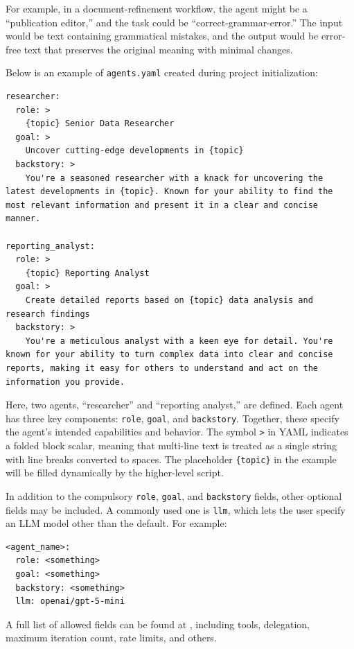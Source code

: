 For example, in a document-refinement workflow, the agent might be a ``publication editor,'' and the task could be ``correct-grammar-error.'' The input would be text containing grammatical mistakes, and the output would be error-free text that preserves the original meaning with minimal changes.

Below is an example of \verb|agents.yaml| created during project initialization:
\begin{lstlisting}
researcher:
  role: >
    {topic} Senior Data Researcher
  goal: >
    Uncover cutting-edge developments in {topic}
  backstory: >
    You're a seasoned researcher with a knack for uncovering the latest developments in {topic}. Known for your ability to find the most relevant information and present it in a clear and concise manner.

reporting_analyst:
  role: >
    {topic} Reporting Analyst
  goal: >
    Create detailed reports based on {topic} data analysis and research findings
  backstory: >
    You're a meticulous analyst with a keen eye for detail. You're known for your ability to turn complex data into clear and concise reports, making it easy for others to understand and act on the information you provide.
\end{lstlisting}

Here, two agents, ``researcher'' and ``reporting analyst,'' are defined. Each agent has three key components: \verb|role|, \verb|goal|, and \verb|backstory|. Together, these specify the agent’s intended capabilities and behavior. The symbol \verb|>| in YAML indicates a folded block scalar, meaning that multi-line text is treated as a single string with line breaks converted to spaces. The placeholder \verb|{topic}| in the example will be filled dynamically by the higher-level script.

In addition to the compulsory \verb|role|, \verb|goal|, and \verb|backstory| fields, other optional fields may be included. A commonly used one is \verb|llm|, which lets the user specify an LLM model other than the default. For example:
\begin{lstlisting}
<agent_name>:
  role: <something>
  goal: <something>
  backstory: <something>
  llm: openai/gpt-5-mini
\end{lstlisting}
A full list of allowed fields can be found at \cite{crewaiAgentsConcepts}, including tools, delegation, maximum iteration count, rate limits, and others.

